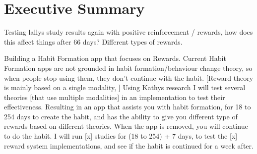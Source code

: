 
\section*{Executive Summary}
Testing lallys study results again with positive reinforcement / rewards, how does this affect things after 66 days? Different types of rewards.

Building a Habit Formation app that focuses on Rewards. Current Habit Formation apps are not grounded in habit formation/behaviour change theory, so when people stop using them, they don't continue with the habit. [Reward theory is mainly based on a single modality, ] Using Kathys research I will test several theories [that use multiple modalities] in an implementation to test their effectiveness. Resulting in an app that assists you with habit formation, for 18 to 254 days to create the habit, and has the ability to give you different type of rewards based on different theories. When the app is removed, you will continue to do the habit. I will run [x] studies for (18 to 254) + 7 days, to test the [x] reward system implementations, and see if the habit is continued for a week after.




